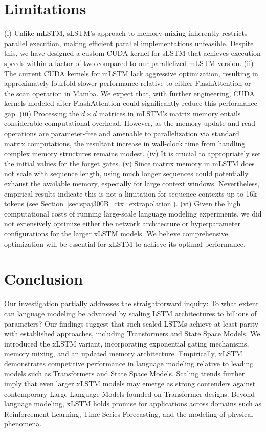 \section{Limitations}

(i) Unlike mLSTM, sLSTM's approach to memory mixing inherently restricts parallel execution, making efficient parallel implementations unfeasible. Despite this, we have designed a custom CUDA kernel for sLSTM that achieves execution speeds within a factor of two compared to our parallelized mLSTM version. (ii) The current CUDA kernels for mLSTM lack aggressive optimization, resulting in approximately fourfold slower performance relative to either FlashAttention or the scan operation in Mamba. We expect that, with further engineering, CUDA kernels modeled after FlashAttention could significantly reduce this performance gap. (iii) Processing the $d \times d$ matrices in mLSTM's matrix memory entails considerable computational overhead. However, as the memory update and read operations are parameter-free and amenable to parallelization via standard matrix computations, the resultant increase in wall-clock time from handling complex memory structures remains modest. (iv) It is crucial to appropriately set the initial values for the forget gates. (v) Since matrix memory in mLSTM does not scale with sequence length, using much longer sequences could potentially exhaust the available memory, especially for large context windows. Nevertheless, empirical results indicate this is not a limitation for sequence contexts up to 16k tokens (see Section~\ref{sec:spaj300B_ctx_extrapolation}). (vi) Given the high computational costs of running large-scale language modeling experiments, we did not extensively optimize either the network architecture or hyperparameter configurations for the larger xLSTM models. We believe comprehensive optimization will be essential for xLSTM to achieve its optimal performance.

\section{Conclusion}
Our investigation partially addresses the straightforward inquiry: To what extent can language modeling be advanced by scaling LSTM architectures to billions of parameters? Our findings suggest that such scaled LSTMs achieve at least parity with established approaches, including Transformers and State Space Models. We introduced the xLSTM variant, incorporating exponential gating mechanisms, memory mixing, and an updated memory architecture. Empirically, xLSTM demonstrates competitive performance in language modeling relative to leading models such as Transformers and State Space Models. Scaling trends further imply that even larger xLSTM models may emerge as strong contenders against contemporary Large Language Models founded on Transformer designs. Beyond language modeling, xLSTM holds promise for applications across domains such as Reinforcement Learning, Time Series Forecasting, and the modeling of physical phenomena.

